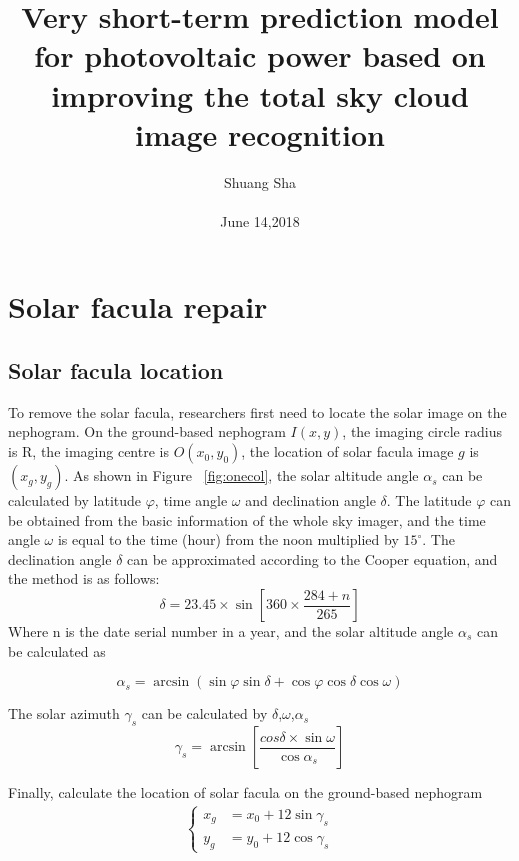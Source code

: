 \documentclass[10pt,twocolumn,letterpaper]{article}
\begin{document}
\title{Very short-term prediction model for photovoltaic power based on improving the total sky cloud image recognition}

\author{Shuang Sha \\\\ June 14,2018}

\maketitle



\section{Solar facula repair}
\subsection{Solar facula location}
To remove the solar facula, researchers first need to locate the solar image on the nephogram. On the ground-based nephogram $I(x,y)$, the imaging circle radius is R, the imaging centre is $O(x_0,y_0)$, the location of solar facula image $g$ is $(x_g,y_g)$. As shown in Figure ~\ref{fig:onecol}, the solar altitude angle $\alpha_s$ can be calculated by latitude $\varphi$, time angle $\omega$ and declination angle $\delta$.
The latitude $\varphi$ can be obtained from the basic information of the whole sky imager, and the time angle $\omega$ is equal to the time (hour) from the noon multiplied by $15^\circ$. The declination angle $\delta$ can be approximated according to the Cooper equation, and the method is as follows:
\begin{equation}
\delta=23.45 \times \sin[360 \times \frac{284+n}{265}]
\end{equation}
Where n is the date serial number in a year, and the solar altitude angle $\alpha_s$ can be calculated as

\begin{equation}
\alpha_s=\arcsin (\sin\varphi\sin\delta+\cos\varphi\cos\delta\cos\omega)
\end{equation}

The solar azimuth $\gamma_s$ can be calculated by $\delta$,$\omega$,$\alpha_s$
\begin{equation}
\gamma_s=\arcsin[\frac{cos\delta \times \sin \omega}{\cos\alpha_s}]
\end{equation}

Finally, calculate the location of solar facula on the ground-based nephogram
\begin{align}
\begin{cases}
x_g &=x_0+12\sin\gamma_s \\
y_g &=y_0+12\cos\gamma_s
\end{cases}
\end{align}
\end{document}
